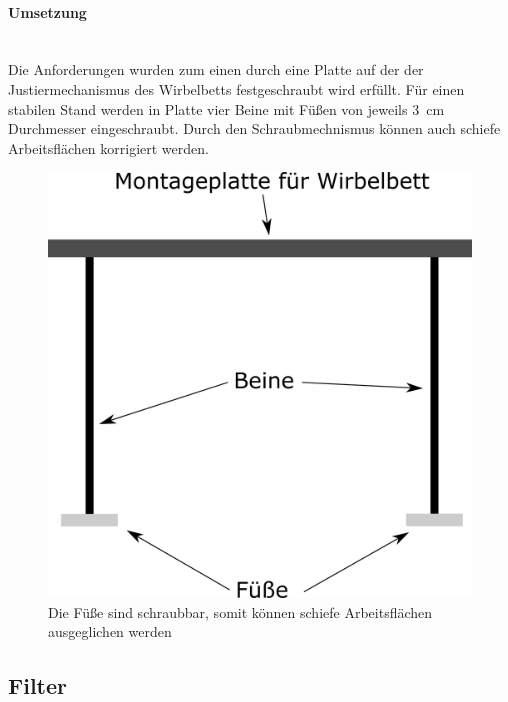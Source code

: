 \paragraph{Umsetzung}
\hfill \\
Die Anforderungen wurden zum einen durch eine Platte auf der der Justiermechanismus des Wirbelbetts festgeschraubt wird erfüllt. Für einen stabilen Stand werden in Platte vier Beine mit Füßen von jeweils \SI{3}{cm} Durchmesser eingeschraubt. Durch den Schraubmechnismus können auch schiefe Arbeitsflächen korrigiert werden.



\begin{figure}[h]
	\begin{center}
	\includegraphics[scale=0.6]{Halterung_Labor_Seite.png}
	\caption[Halterung Labor]{Die Füße sind schraubbar, somit können schiefe Arbeitsflächen ausgeglichen werden}
    \end{center}
\end{figure}


\newpage

\subsection{Filter}

